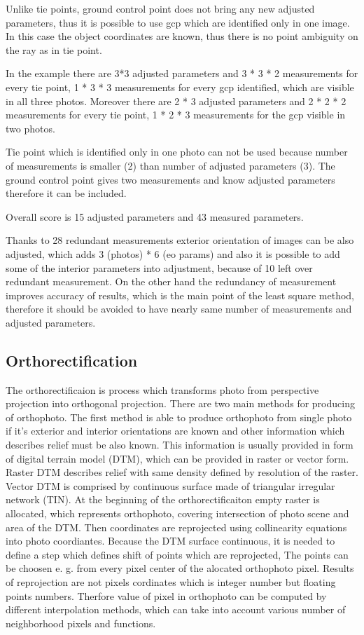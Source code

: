 \documentclass[a4paper,12pt]{article}
\begin{document}
Unlike tie points, ground control point does not bring any new adjusted parameters, thus
it is possible to use gcp which are identified only in one image. In this case the object coordinates 
are known, thus there is no point ambiguity on the ray as in tie point. 

In the example there are 3*3 adjusted parameters and 3 * 3 * 2 measurements for every tie point,  
1 * 3 * 3 measurements for every gcp identified, which are visible in all three photos. 
Moreover there are 2 * 3 adjusted parameters and 2 * 2 * 2 measurements for every tie point,  
1 * 2 * 3 measurements for the gcp visible in two photos.

Tie point which is identified only in one photo can not be used because number of measurements is smaller (2) than number of adjusted parameters (3).
The ground control point gives two measurements and know adjusted parameters therefore it can be included.

Overall score is 15 adjusted parameters and 43 measured parameters.

Thanks to 28 redundant measurements exterior orientation of images can be also adjusted, which adds 3 (photos) * 6 (eo params)
and also it is possible to add some of the interior parameters into adjustment, because of 10 left over redundant measurement.  
On the other hand the redundancy of measurement improves accuracy of results, which is the main point of the least square method,
therefore it should be avoided to have nearly same number of measurements and adjusted parameters.

\subsection{Orthorectification}

The orthorectificaion is process which transforms photo from perspective projection into orthogonal projection. 
\label{sec:single_ortho}
There are two main methods for producing of orthophoto. The first method is able to produce orthophoto 
from single photo if it's exterior and interior orientations are known and other information which describes
relief must be also known. This information is usually provided in form of digital terrain model (DTM), which 
can be provided in raster or vector form. Raster DTM describes relief with same density defined by resolution of the raster.
Vector DTM is comprised by continuous surface made of triangular irregular network (TIN). 
At the beginning of the orthorectificaiton empty raster is allocated, which represents orthophoto, 
covering intersection of photo scene and area of the DTM. Then coordinates are reprojected using collinearity
equations into photo coordiantes. Because the DTM surface continuous, it is needed to define 
a step which defines shift of points which are reprojected, The points can be choosen e. g. from every pixel center
of the alocated orthophoto pixel. Results of reprojection are not pixels cordinates which is integer number but 
floating points numbers. Therfore value of pixel in orthophoto can be computed by different interpolation methods,
which can take into account various number of neighborhood pixels and functions.
\end{document}
